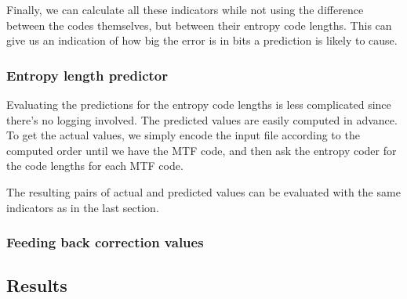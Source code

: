 \documentclass[a4paper]{scrreprt}
\begin{document}
Finally, we can calculate all these indicators while not using the difference
between the codes themselves, but between their entropy code lengths. This can
give us an indication of how big the error is in bits a prediction is likely to
cause.

\subsubsection{Entropy length predictor}

Evaluating the predictions for the entropy code lengths is less complicated
since there's no logging involved. The predicted values are easily computed in
advance. To get the actual values, we simply encode the input file according to
the computed order until we have the MTF code, and then ask the entropy coder
for the code lengths for each MTF code.

The resulting pairs of actual and predicted values can be evaluated with the
same indicators as in the last section.


\subsubsection{Feeding back correction values}

\subsection{Results}
\end{document}
